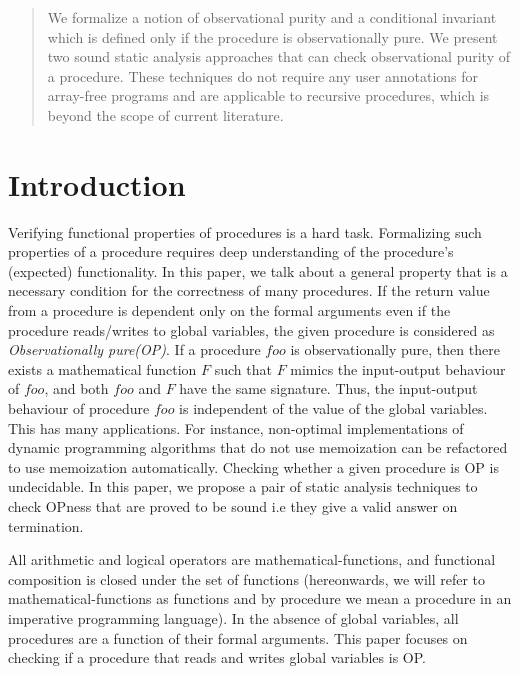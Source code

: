 \documentclass{llncs}
\newcommand{\foo}{\textit{foo}}
\newcommand{\F}{\mathit{F}}
\begin{document}
\begin{abstract}
  We formalize a notion of observational purity and a conditional
  invariant which is defined only if the procedure is observationally
  pure.  We present two sound static analysis approaches that can
  check observational purity of a procedure. These techniques do not
  require any user annotations for array-free programs and are
  applicable to recursive procedures, which is beyond the scope of
  current literature.

\end{abstract}

\section{Introduction}
Verifying functional properties of procedures is a hard task.
Formalizing such properties of a procedure requires deep understanding
of the procedure's (expected) functionality.  In this paper, we talk
about a general property that is a necessary condition for the
correctness of many procedures. If the return value from a procedure
is dependent only on the formal arguments even if the procedure
reads/writes to global variables, the given procedure is considered as
\textit{Observationally pure(OP)}.  If a procedure $\foo$ is
observationally pure, then there exists a mathematical function $\F$
such that $\F$ mimics the input-output behaviour of $\foo$, and both
$\foo$ and $\F$ have the same signature.  Thus, the input-output
behaviour of procedure $\foo$ is independent of the value of the
global variables.  This has many applications. For instance,
non-optimal implementations of dynamic programming algorithms that do
not use memoization can be refactored to use memoization
automatically.  Checking whether a given procedure is OP is
undecidable. In this paper, we propose a pair of static analysis
techniques to check OPness that are proved to be sound i.e they give a
valid answer on termination.

All arithmetic and logical operators are mathematical-functions, and
functional composition is closed under the set of functions
(hereonwards, we will refer to mathematical-functions as functions and
by procedure we mean a procedure in an imperative programming
language).  In the absence of global variables, all procedures are a
function of their formal arguments. This paper focuses on checking if
a procedure that reads and writes global variables is OP.
\end{document}
